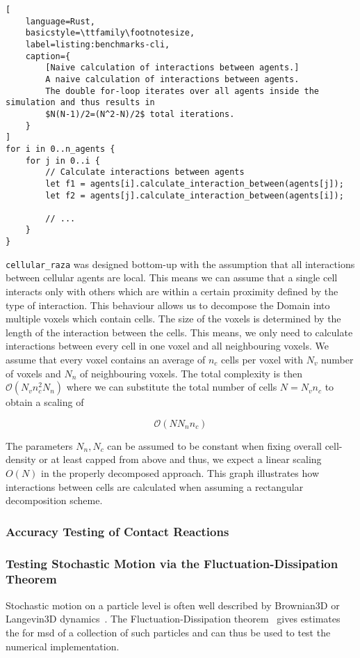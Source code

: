 \documentclass[a4paper]{article}
\begin{document}
\begin{minipage}{\linewidth}\begin{lstlisting}[
    language=Rust,
    basicstyle=\ttfamily\footnotesize,
    label=listing:benchmarks-cli,
    caption={
        [Naive calculation of interactions between agents.]
        A naive calculation of interactions between agents.
        The double for-loop iterates over all agents inside the simulation and thus results in
        $N(N-1)/2=(N^2-N)/2$ total iterations.
    }
]
for i in 0..n_agents {
    for j in 0..i {
        // Calculate interactions between agents
        let f1 = agents[i].calculate_interaction_between(agents[j]);
        let f2 = agents[j].calculate_interaction_between(agents[i]);

        // ...
    }
}
\end{lstlisting}\end{minipage}

\texttt{cellular\_raza} was designed bottom-up with the assumption that all interactions between
cellular agents are local.
This means we can assume that a single cell interacts only with others which are within a certain
proximity defined by the type of interaction.
This behaviour allows us to decompose the Domain into multiple voxels which contain cells.
The size of the voxels is determined by the length of the interaction between the cells.
This means, we only need to calculate interactions between every cell in one voxel and all
neighbouring voxels.
We assume that every voxel contains an average of $n_c$ cells per voxel with $N_v$ number
of voxels and $N_n$ of neighbouring voxels.
The total complexity is then $\mathcal{O}(N_vn_c^2N_n)$ where we can substitute the
total number of cells $N=N_vn_c$ to obtain a scaling of

\begin{equation}
    \mathcal{O}(NN_nn_c)
\end{equation}

The parameters $N_n,N_c$ can be assumed to be constant when fixing overall cell-density or at least
capped from above and thus, we expect a linear scaling $O(N)$ in the properly decomposed approach.
This graph illustrates how interactions between cells are calculated when assuming a rectangular decomposition scheme.

\subsubsection{Accuracy Testing of Contact Reactions}
\subsubsection{Testing Stochastic Motion via the Fluctuation-Dissipation Theorem}
Stochastic motion on a particle level is often well described by Brownian3D or Langevin3D
dynamics~\cite{Brown1828,Lemons1997}.
The Fluctuation-Dissipation theorem~\cite{Callen1951} gives estimates the for \ac{msd} of a
collection of such particles and can thus be used to test the numerical
implementation.
\end{document}
